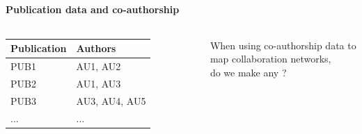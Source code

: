 \documentclass[8pt]{beamer}
\begin{document}

\bgroup
{}
\begin{frame}[plain]{}
\\
\tiny{{\color{white}{Source: Co-authorship data in microneedles research (2000-2014)}}}
\end{frame}
\egroup



\begin{frame}
\frametitle{\insertsection}
\framesubtitle{Publication data and co-authorship}


\begin{columns}[c]

\centering

\begin{table}
\begin{tabular}{|l|l|}
\hline
Publication  & Authors \\
\hline
PUB1       & AU1, AU2\\
PUB2       & AU1, AU3 \\
PUB3       & AU3, AU4, AU5\\
...        & ...\\
\hline
\end{tabular}
\end{table}

\centering
When using co-authorship data to map collaboration networks, \\
do we make any {\color{red}{assumption}}?

\end{columns}

\end{frame}
\end{document}
